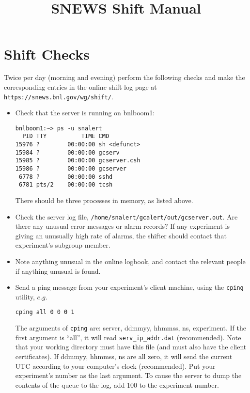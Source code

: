 \documentclass{article}
\begin{document}
\title{SNEWS Shift Manual}         
\maketitle

\section{Shift Checks}      

Twice per day (morning and evening) perform the following checks
and make the corresponding entries in the online shift log page at\\
\texttt{https://snews.bnl.gov/wg/shift/}.

\begin{itemize}

\item Check that the server is running on bnlboom1:
  
\begin{verbatim}
bnlboom1:~> ps -u snalert
  PID TTY          TIME CMD
15976 ?        00:00:00 sh <defunct>
15984 ?        00:00:00 gcserv
15985 ?        00:00:00 gcserver.csh
15986 ?        00:00:00 gcserver
 6778 ?        00:00:00 sshd
 6781 pts/2    00:00:00 tcsh
\end{verbatim}
There should be three processes in memory, as listed above.

\item Check the server log file, \texttt{/home/snalert/gcalert/out/gcserver.out}.  Are there any unusual error messages or alarm records?
If any experiment is giving an unusually high rate of alarms, the
shifter should contact that experiment's subgroup member.

\item Note anything unusual in the online logbook, and contact
the relevant people if anything unusual is found.  

\item Send a ping message from your experiment's client machine, using
the \texttt{cping} utility, $e.g.$

\begin{verbatim}
cping all 0 0 0 1
\end{verbatim}

The arguments of \texttt{cping} are: server, ddmmyy, hhmmss, ns,
experiment.  If the first argument is ``all'', it will read
\texttt{serv\_ip\_addr.dat} (recommended).  Note that your working
directory must have this file (and must also have the client
certificates).
If ddmmyy, hhmmss, ns are all zero, it will send the
current UTC according to your
computer's clock (recommended).  Put your experiment's number as the last
argument.  To cause the server to dump the contents of the queue
to the log, add 100 to the experiment number.


\end{itemize}
\end{document}
